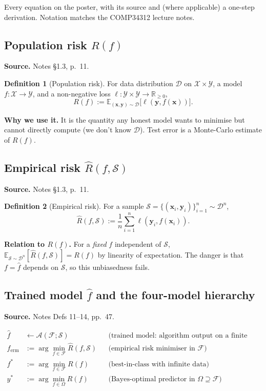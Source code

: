\documentclass[11pt,a4paper]{article}
\newcommand{\E}{\mathbb{E}}
\newcommand{\D}{\mathcal{D}}
\newcommand{\F}{\mathcal{F}}
\newcommand{\Sset}{\mathcal{S}}
\newcommand{\X}{\mathcal{X}}
\newcommand{\Y}{\mathcal{Y}}
\theoremstyle{definition}
\newtheorem{defn}{Definition}
\begin{document}
Every equation on the poster, with its source and (where applicable) a one-step derivation. Notation matches the COMP34312 lecture notes.

\subsection{Population risk \texorpdfstring{$R(f)$}{R(f)}}

\noindent\textbf{Source.} Notes \S1.3, p.~11.

\begin{defn}[Population risk]
For data distribution $\D$ on $\X\times\Y$, a model $f:\X\to\Y$, and a non-negative loss $\ell:\Y\times\Y\to\mathbb{R}_{\ge 0}$,
\[
R(f) := \E_{(\bm{x},\bm{y})\sim\D}\bigl[\ell(\bm{y},f(\bm{x}))\bigr].
\]
\end{defn}

\noindent\textbf{Why we use it.} It is the quantity any honest model wants to minimise but cannot directly compute (we don't know $\D$). Test error is a Monte-Carlo estimate of $R(f)$.

\subsection{Empirical risk \texorpdfstring{$\widehat R(f,\Sset)$}{R-hat(f, S)}}

\noindent\textbf{Source.} Notes \S1.3, p.~11.

\begin{defn}[Empirical risk]
For a sample $\Sset = \{(\bm{x}_i,\bm{y}_i)\}_{i=1}^{n}\sim\D^n$,
\[
\widehat R(f,\Sset) := \frac{1}{n}\sum_{i=1}^{n}\ell(\bm{y}_i,f(\bm{x}_i)).
\]
\end{defn}

\noindent\textbf{Relation to $R(f)$.} For a \emph{fixed} $f$ independent of $\Sset$, $\E_{\Sset\sim\D^n}[\widehat R(f,\Sset)] = R(f)$ by linearity of expectation. The danger is that $f = \hat f$ depends on $\Sset$, so this unbiasedness fails.

\subsection{Trained model \texorpdfstring{$\hat f$}{f-hat} and the four-model hierarchy}

\noindent\textbf{Source.} Notes Defs 11--14, pp.~47.

\begin{align*}
\hat f &\leftarrow \mathcal{A}(\F;\Sset) && \text{(trained model: algorithm output on a finite sample)}\\
f_{\mathrm{erm}} &:= \arg\min_{f\in\F}\widehat R(f,\Sset) && \text{(empirical risk minimiser in $\F$)}\\
f^{*} &:= \arg\min_{f\in\F}R(f) && \text{(best-in-class with infinite data)}\\
y^{*} &:= \arg\min_{f\in\Omega}R(f) && \text{(Bayes-optimal predictor in $\Omega\supseteq\F$)}
\end{align*}
\end{document}
